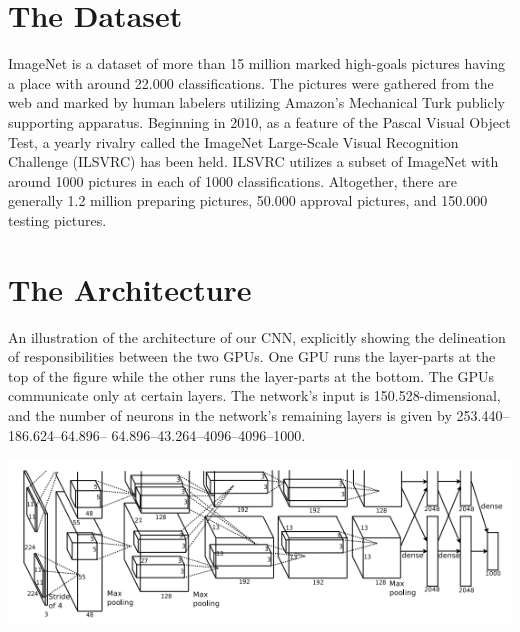 \documentclass[12pt]{article}
\begin{document}
\section*{The Dataset}
\hspace{10mm}ImageNet is a dataset of more than 15 million marked high-goals pictures having a place with around 22.000 classifications. The pictures were gathered from the web and marked by human labelers utilizing Amazon's Mechanical Turk publicly supporting apparatus. Beginning in 2010, as a feature of the Pascal Visual Object Test, a yearly rivalry called the ImageNet Large-Scale Visual Recognition Challenge (ILSVRC) has been held. ILSVRC utilizes a subset of ImageNet with around 1000 pictures in each of 1000 classifications. Altogether, there are generally 1.2 million preparing pictures, 50.000 approval pictures, and 150.000 testing pictures.


\section*{The Architecture}
\hspace{10mm}An illustration of the architecture of our CNN, explicitly showing the delineation of responsibilities between the two GPUs. One GPU runs the layer-parts at the top of the figure while the other runs the layer-parts at the bottom. The GPUs communicate only at certain layers. The network’s input is 150.528-dimensional, and the number of neurons in the network’s remaining layers is given by 253.440–186.624–64.896– 64.896–43.264–4096–4096–1000.
\begin{center}
\includegraphics[scale=1]{1}
\end{center}

\end{document}
